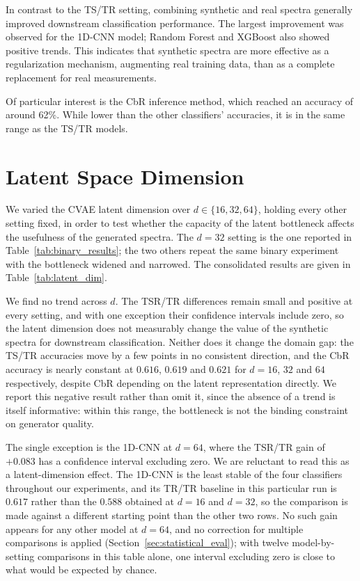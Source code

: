 In contrast to the TS/TR setting, combining synthetic and real spectra generally improved downstream classification performance. The largest improvement was observed for the 1D-CNN model; Random Forest and XGBoost also showed positive trends. This indicates that synthetic spectra are more effective as a regularization mechanism, augmenting real training data, than as a complete replacement for real measurements.

Of particular interest is the CbR inference method, which reached an accuracy of around 62\%. While lower than the other classifiers' accuracies, it is in the same range as the TS/TR models.

\section{Latent Space Dimension}
\label{sec:results_latent}

We varied the CVAE latent dimension over $d \in \{16, 32, 64\}$, holding every other setting
fixed, in order to test whether the capacity of the latent bottleneck affects the usefulness of
the generated spectra. The $d=32$ setting is the one reported in
Table~\ref{tab:binary_results}; the two others repeat the same binary experiment with the
bottleneck widened and narrowed. The consolidated results are given in
Table~\ref{tab:latent_dim}.

We find no trend across $d$. The TSR/TR differences remain small and positive at every setting,
and with one exception their confidence intervals include zero, so the latent dimension does not
measurably change the value of the synthetic spectra for downstream classification. Neither does
it change the domain gap: the TS/TR accuracies move by a few points in no consistent direction,
and the CbR accuracy is nearly constant at $0.616$, $0.619$ and $0.621$ for $d=16$, $32$ and
$64$ respectively, despite CbR depending on the latent representation directly. We report this
negative result rather than omit it, since the absence of a trend is itself informative: within
this range, the bottleneck is not the binding constraint on generator quality.

The single exception is the 1D-CNN at $d=64$, where the TSR/TR gain of $+0.083$ has a confidence
interval excluding zero. We are reluctant to read this as a latent-dimension effect. The 1D-CNN
is the least stable of the four classifiers throughout our experiments, and its TR/TR baseline
in this particular run is $0.617$ rather than the $0.588$ obtained at $d=16$ and $d=32$, so the
comparison is made against a different starting point than the other two rows. No such gain
appears for any other model at $d=64$, and no correction for multiple comparisons is applied
(Section~\ref{sec:statistical_eval}); with twelve model-by-setting comparisons in this table
alone, one interval excluding zero is close to what would be expected by chance.

